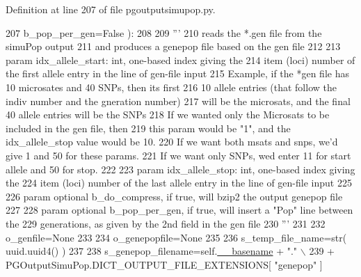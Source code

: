 Definition at line 207 of file pgoutputsimupop.\+py.


\begin{DoxyCode}
207             b\_pop\_per\_gen=\textcolor{keyword}{False} ):
208 
209         \textcolor{stringliteral}{'''}
210 \textcolor{stringliteral}{        reads the *.gen file from the simuPop output}
211 \textcolor{stringliteral}{        and produces a genepop file based on the gen file}
212 \textcolor{stringliteral}{}
213 \textcolor{stringliteral}{        param idx\_allele\_start: int, one-based index giving the}
214 \textcolor{stringliteral}{        item (loci) number of the first allele entry in the line of gen-file input}
215 \textcolor{stringliteral}{        Example, if the *gen file has 10 microsates and 40 SNPs, then its first}
216 \textcolor{stringliteral}{        10 allele entries (that follow the indiv number and the gneration number)}
217 \textcolor{stringliteral}{        will be the microsats, and the final 40 allele entries will be the SNPs}
218 \textcolor{stringliteral}{        If we wanted only the Microsats to be included in the gen file, then}
219 \textcolor{stringliteral}{        this param would be "1", and the idx\_allele\_stop value would be 10. }
220 \textcolor{stringliteral}{        If we want both msats and snps, we'd give 1 and 50 for these params. }
221 \textcolor{stringliteral}{        If we want only SNPs, wed enter 11 for start allele and 50 for stop.}
222 \textcolor{stringliteral}{}
223 \textcolor{stringliteral}{        param idx\_allele\_stop: int, one-based index giving the}
224 \textcolor{stringliteral}{        item (loci) number of the last allele entry in the line of gen-file input}
225 \textcolor{stringliteral}{}
226 \textcolor{stringliteral}{        param optional b\_do\_compress, if true, will bzip2 the output genepop file}
227 \textcolor{stringliteral}{}
228 \textcolor{stringliteral}{        param optional b\_pop\_per\_gen, if true, will insert a "Pop" line between the}
229 \textcolor{stringliteral}{        generations, as given by the 2nd field in the gen file}
230 \textcolor{stringliteral}{        '''}
231 
232         o\_genfile=\textcolor{keywordtype}{None}
233 
234         o\_genepopfile=\textcolor{keywordtype}{None}
235         
236         s\_temp\_file\_name=str( uuid.uuid4() ) 
237     
238         s\_genepop\_filename=self.\hyperlink{classnegui_1_1pgoutputsimupop_1_1PGOutputSimuPop_af6ab3be4b2b1d4c7de28b5aa0f8d76da}{\_\_basename} + \textcolor{stringliteral}{"."}  \(\backslash\)
239                 +  PGOutputSimuPop.DICT\_OUTPUT\_FILE\_EXTENSIONS[ \textcolor{stringliteral}{"genepop"} ]     

\end{DoxyCode}

